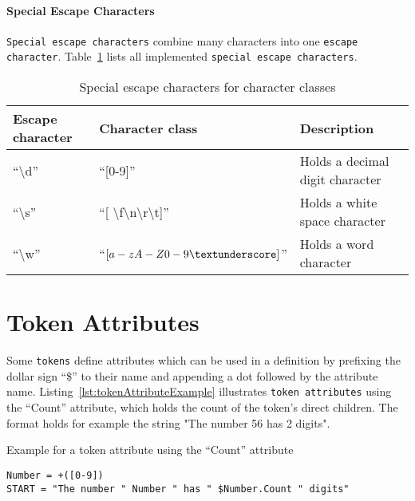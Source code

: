 \paragraph{Special Escape Characters}
\label{subsec:specialEscapeCharacters}

\texttt{Special escape characters} combine many characters into one \texttt{escape character}. Table~\ref{table:specialEscapeCharacters} lists all implemented \texttt{special escape characters}.

\begin{table}[H]
\caption{Special escape characters for character classes}
\label{table:specialEscapeCharacters}
\center
\begin{tabular}{| l | l | l |}
\hline
  \textbf{Escape character}
& \textbf{Character class}
& \textbf{Description}
\tabularnewline
\hline
  \enquote{\textbackslash{}d}
& \enquote{[0-9]}
& Holds a decimal digit character
\tabularnewline
\hline
  \enquote{\textbackslash{}s}
& \enquote{[ \textbackslash{}f\textbackslash{}n\textbackslash{}r\textbackslash{}t]}
& Holds a white space character
\tabularnewline
\hline
  \enquote{\textbackslash{}w}
& \enquote{$[a-zA-Z0-9\textunderscore]$}
& Holds a word character
\tabularnewline
\hline
\end{tabular}
\end{table}

\section{Token Attributes}
\label{sec:tokenAttributes}

Some \texttt{tokens} define attributes which can be used in a definition by prefixing the dollar sign \enquote{\$} to their name and appending a dot followed by the attribute name. Listing~\ref{lst:tokenAttributeExample} illustrates \texttt{token attributes} using the \enquote{Count} attribute, which holds the count of the token's direct children. The format holds for example the string "The number 56 has 2 digits".

\begin{listing}
\caption{Example for a token attribute using the ``Count'' attribute}
\label{lst:tokenAttributeExample}
\begin{verbatim}
Number = +([0-9])
START = "The number " Number " has " $Number.Count " digits"
\end{verbatim}
\end{listing}

